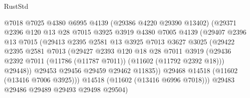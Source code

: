 \begin{lexlean}{RustStd}
\begin{coremodule}
                              @7018
                              @7025
                              @4380
                              @6995
                              @4139
                              (@29386 @4220 @29390 @13402)
                              (@29371
                                @2396
                                @120
                                @13
                                @28
                                @7015
                                @3925
                                @3919
                                @4380
                                @7005
                                @4139
                                (@29407
                                  @2396
                                  @13
                                  @7015
                                  (@29413
                                    @2395
                                    @2581
                                    @13
                                    @3925
                                    @7013
                                    @3627
                                    @3025
                                    (@29422
                                      @2395
                                      @2581
                                      @7013
                                      (@29427
                                        @2393
                                        @120
                                        @18
                                        @28
                                        @7011
                                        @3919
                                        (@29436
                                          @2392
                                          @7011
                                          (@11786 (@11787 @7011))
                                          (@11602 (@11792 @2392 @18)))
                                        @29448))
                                    @29453
                                    @29456
                                    @29459
                                    @29462
                                    @11835))
                                @29468
                                @14518
                                (@11602 (@13416 @7006 @3925)))
                              @14518
                              (@11602 (@13416 @6996 @7018)))
                            @29483
                            @29486
                            @29489
                            @29493
                            @29498
                            @29504)

\end{coremodule}
\end{lexlean}
